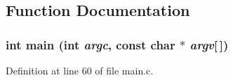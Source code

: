 \subsection{Function Documentation}
\subsubsection[{main}]{\setlength{\rightskip}{0pt plus 5cm}int main (int {\em argc}, \/  const char $\ast$ {\em argv}[$\,$])}\label{d0/d29/main_8c_ac0f2228420376f4db7e1274f2b41667c}


Definition at line 60 of file main.c.

